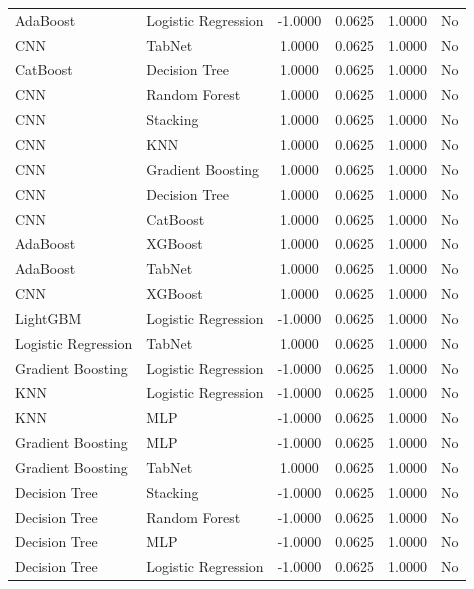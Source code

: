 \documentclass[a4paper,fleqn]{cas-sc}
\begin{document}
{\begin{longtable}{l l c c c c}
AdaBoost            & Logistic Regression & -1.0000 & 0.0625 & 1.0000 & No \\
CNN                 & TabNet              &  1.0000 & 0.0625 & 1.0000 & No \\
CatBoost            & Decision Tree       &  1.0000 & 0.0625 & 1.0000 & No \\
CNN                 & Random Forest       &  1.0000 & 0.0625 & 1.0000 & No \\
CNN                 & Stacking            &  1.0000 & 0.0625 & 1.0000 & No \\
CNN                 & KNN                 &  1.0000 & 0.0625 & 1.0000 & No \\
CNN                 & Gradient Boosting   &  1.0000 & 0.0625 & 1.0000 & No \\
CNN                 & Decision Tree       &  1.0000 & 0.0625 & 1.0000 & No \\
CNN                 & CatBoost            &  1.0000 & 0.0625 & 1.0000 & No \\
AdaBoost            & XGBoost             &  1.0000 & 0.0625 & 1.0000 & No \\
AdaBoost            & TabNet              &  1.0000 & 0.0625 & 1.0000 & No \\
CNN                 & XGBoost             &  1.0000 & 0.0625 & 1.0000 & No \\
LightGBM            & Logistic Regression & -1.0000 & 0.0625 & 1.0000 & No \\
Logistic Regression & TabNet              &  1.0000 & 0.0625 & 1.0000 & No \\
Gradient Boosting   & Logistic Regression & -1.0000 & 0.0625 & 1.0000 & No \\
KNN                 & Logistic Regression & -1.0000 & 0.0625 & 1.0000 & No \\
KNN                 & MLP                 & -1.0000 & 0.0625 & 1.0000 & No \\
Gradient Boosting   & MLP                 & -1.0000 & 0.0625 & 1.0000 & No \\
Gradient Boosting   & TabNet              &  1.0000 & 0.0625 & 1.0000 & No \\
Decision Tree       & Stacking            & -1.0000 & 0.0625 & 1.0000 & No \\
Decision Tree       & Random Forest       & -1.0000 & 0.0625 & 1.0000 & No \\
Decision Tree       & MLP                 & -1.0000 & 0.0625 & 1.0000 & No \\
Decision Tree       & Logistic Regression & -1.0000 & 0.0625 & 1.0000 & No \\

\end{longtable}}
\end{document}
